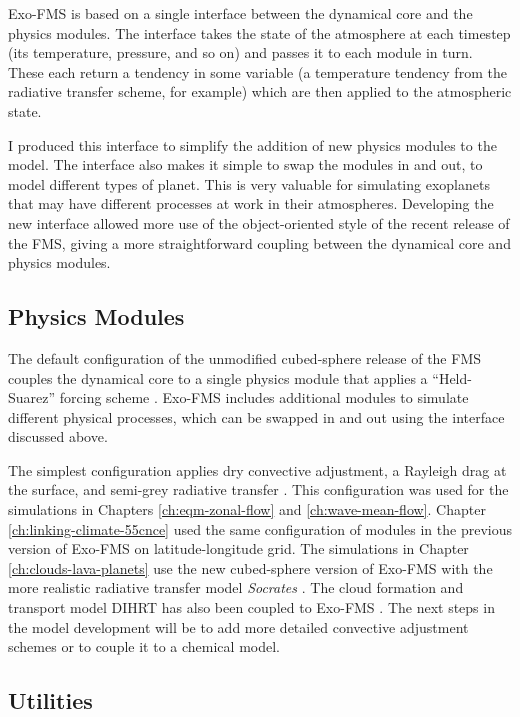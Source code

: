 Exo-FMS is based on a single interface between the dynamical core and the physics modules. The interface takes the state of the atmosphere at each timestep (its temperature, pressure, and so on) and passes it to each module in turn. These each return a tendency in some variable (a temperature tendency from the radiative transfer scheme, for example) which are then applied to the atmospheric state.

I produced this interface to simplify the addition of new physics modules to the model. The interface also makes it simple to swap the modules in and out, to model different types of planet. This is very valuable for simulating exoplanets that may have different processes at work in their atmospheres. Developing the new interface allowed more use of the object-oriented style of the recent release of the FMS, giving a more straightforward coupling between the dynamical core and physics modules.


\subsection{Physics Modules}

The default configuration of the unmodified cubed-sphere release of the FMS couples the dynamical core to a single physics module that applies a ``Held-Suarez'' forcing scheme \citep{held1994proposal}. Exo-FMS includes additional modules to simulate different physical processes, which can be swapped in and out using the interface discussed above.

The simplest configuration applies dry convective adjustment, a Rayleigh drag at the surface, and semi-grey radiative transfer \citep{pierrehumbert2010principles}. This configuration was used for the simulations in Chapters \ref{ch:eqm-zonal-flow} and \ref{ch:wave-mean-flow}. Chapter \ref{ch:linking-climate-55cnce} used the same configuration of modules in the previous version of Exo-FMS on latitude-longitude grid. The simulations in Chapter \ref{ch:clouds-lava-planets} use the new cubed-sphere version of Exo-FMS with the more realistic radiative transfer model \textit{Socrates} \citep{edwards1996socrates}. The  cloud formation and transport model DIHRT has also been coupled to Exo-FMS \citep{lee2016dynamic}. The next steps in the model development will be to add more detailed convective adjustment schemes or to couple it to a chemical model.


\subsection{Utilities}


